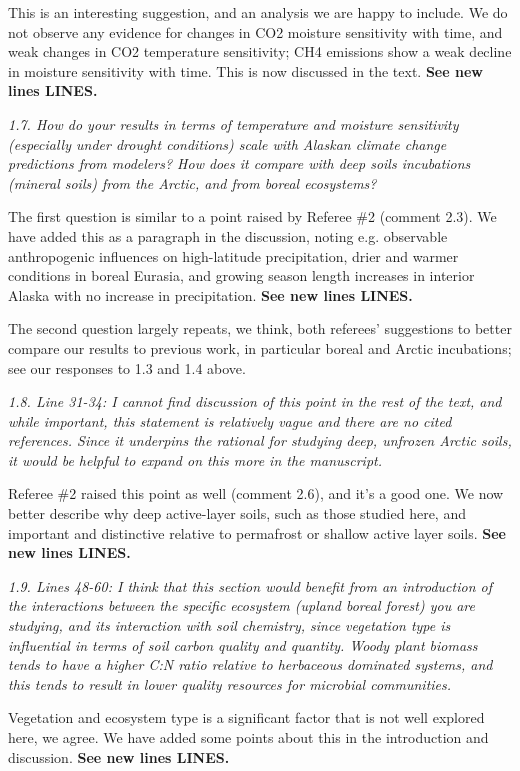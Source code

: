 \documentclass[11pt, oneside]{article}
\begin{document}
This is an interesting suggestion, and an analysis we are happy to include. We do not observe any evidence for changes in CO2 moisture sensitivity with time, and weak changes in CO2 temperature sensitivity; CH4 emissions show a weak decline in moisture sensitivity with time. This is now discussed in the text. {\bf See new lines LINES.}

\medskip
{\it 1.7. How do your results in terms of temperature and moisture sensitivity (especially under drought conditions) scale with Alaskan climate change predictions from modelers? How does it compare with deep soils incubations (mineral soils) from the Arctic, and from boreal ecosystems? }

The first question is similar to a point raised by Referee \#2 (comment 2.3). We have added this as a paragraph in the discussion, noting e.g. observable anthropogenic influences on high-latitude precipitation, drier and warmer conditions in boreal Eurasia, and growing season length increases in interior Alaska with no increase in precipitation. {\bf See new lines LINES.}

The second question largely repeats, we think, both referees' suggestions to better compare our results to previous work, in particular boreal and Arctic incubations; see our responses to 1.3 and 1.4 above.

\medskip
{\it 1.8. Line 31-34: I cannot find discussion of this point in the rest of the text, and while important, this statement is relatively vague and there are no cited references. Since it underpins the rational for studying deep, unfrozen Arctic soils, it would be helpful to expand on this more in the manuscript. }

Referee \#2 raised this point as well (comment 2.6), and it's a good one. We now better describe why deep active-layer soils, such as those studied here, and important and distinctive relative to permafrost or shallow active layer soils.  {\bf See new lines LINES.}

\medskip
{\it 1.9. Lines 48-60: I think that this section would benefit from an introduction of the interactions between the specific ecosystem (upland boreal forest) you are studying, and its interaction with soil chemistry, since vegetation type is influential in terms of soil carbon quality and quantity. Woody plant biomass tends to have a higher C:N ratio relative to herbaceous dominated systems, and this tends to result in lower quality resources for microbial communities. }

Vegetation and ecosystem type is a significant factor that is not well explored here, we agree. We have added some points about this in the introduction and discussion. {\bf See new lines LINES.}
\end{document}

